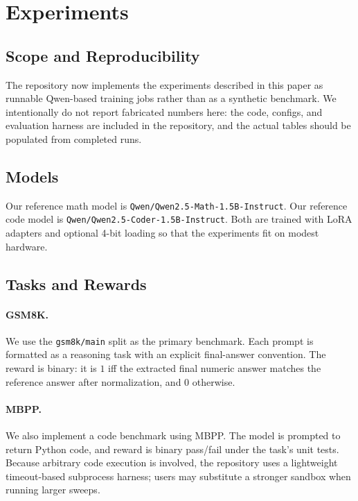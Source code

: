 \section{Experiments}\label{sec:experiments}

\subsection{Scope and Reproducibility}

The repository now implements the experiments described in this paper as runnable Qwen-based training jobs rather than as a synthetic benchmark. We intentionally do not report fabricated numbers here: the code, configs, and evaluation harness are included in the repository, and the actual tables should be populated from completed runs.

\subsection{Models}

Our reference math model is \texttt{Qwen/Qwen2.5-Math-1.5B-Instruct}. Our reference code model is \texttt{Qwen/Qwen2.5-Coder-1.5B-Instruct}. Both are trained with LoRA adapters and optional 4-bit loading so that the experiments fit on modest hardware.

\subsection{Tasks and Rewards}

\paragraph{GSM8K.}
We use the \texttt{gsm8k/main} split as the primary benchmark. Each prompt is formatted as a reasoning task with an explicit final-answer convention. The reward is binary: it is $1$ iff the extracted final numeric answer matches the reference answer after normalization, and $0$ otherwise.

\paragraph{MBPP.}
We also implement a code benchmark using MBPP. The model is prompted to return Python code, and reward is binary pass/fail under the task's unit tests. Because arbitrary code execution is involved, the repository uses a lightweight timeout-based subprocess harness; users may substitute a stronger sandbox when running larger sweeps.

